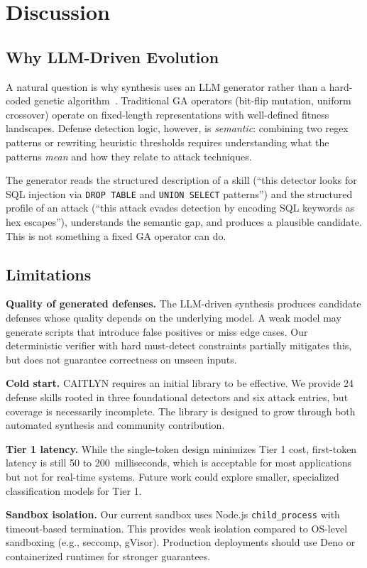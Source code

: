 \section{Discussion}

\subsection{Why LLM-Driven Evolution}

A natural question is why synthesis uses an LLM generator rather than a hard-coded genetic algorithm~\cite{goldberg}. Traditional GA operators (bit-flip mutation, uniform crossover) operate on fixed-length representations with well-defined fitness landscapes. Defense detection logic, however, is \emph{semantic}: combining two regex patterns or rewriting heuristic thresholds requires understanding what the patterns \emph{mean} and how they relate to attack techniques.

The generator reads the structured description of a skill (``this detector looks for SQL injection via \texttt{DROP TABLE} and \texttt{UNION SELECT} patterns'') and the structured profile of an attack (``this attack evades detection by encoding SQL keywords as hex escapes''), understands the semantic gap, and produces a plausible candidate. This is not something a fixed GA operator can do.

\subsection{Limitations}

\textbf{Quality of generated defenses.} The LLM-driven synthesis produces candidate defenses whose quality depends on the underlying model. A weak model may generate scripts that introduce false positives or miss edge cases. Our deterministic verifier with hard must-detect constraints partially mitigates this, but does not guarantee correctness on unseen inputs.

\textbf{Cold start.} CAITLYN requires an initial library to be effective. We provide 24 defense skills rooted in three foundational detectors and six attack entries, but coverage is necessarily incomplete. The library is designed to grow through both automated synthesis and community contribution.

\textbf{Tier 1 latency.} While the single-token design minimizes Tier 1 cost, first-token latency is still 50 to 200~milliseconds, which is acceptable for most applications but not for real-time systems. Future work could explore smaller, specialized classification models for Tier 1.

\textbf{Sandbox isolation.} Our current sandbox uses Node.js \texttt{child\_process} with timeout-based termination. This provides weak isolation compared to OS-level sandboxing (e.g., seccomp, gVisor). Production deployments should use Deno or containerized runtimes for stronger guarantees.
